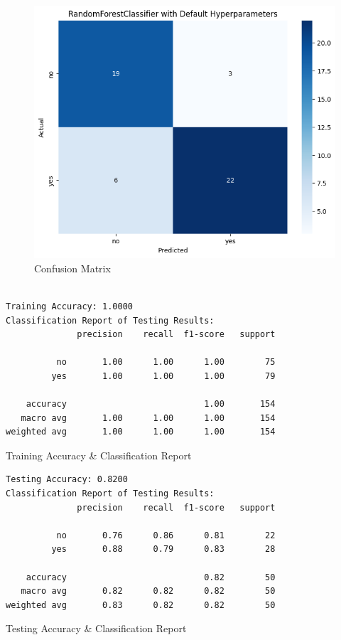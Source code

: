 \documentclass[a4paper, 10pt]{article}
\newenvironment{code}{\captionsetup{type=listing}}{}
\begin{document}
\begin{minipage}{0.45\textwidth} 
\begin{figure}[H]
    \centering
    \includegraphics[width=\textwidth]{./images/randomforestclassifier_defaulthyperparameters_confusionmatrix.png}
    \caption{Confusion Matrix}
\end{figure}
\end{minipage}\hspace{0.05\textwidth}
\begin{minipage}{0.45\textwidth} 
\begin{code}
\begin{verbatim}

Training Accuracy: 1.0000
Classification Report of Testing Results:
              precision    recall  f1-score   support

          no       1.00      1.00      1.00        75
         yes       1.00      1.00      1.00        79

    accuracy                           1.00       154
   macro avg       1.00      1.00      1.00       154
weighted avg       1.00      1.00      1.00       154
\end{verbatim}
\caption{Training Accuracy \& Classification Report}
\end{code}
\begin{code}
\begin{verbatim}
Testing Accuracy: 0.8200
Classification Report of Testing Results:
              precision    recall  f1-score   support

          no       0.76      0.86      0.81        22
         yes       0.88      0.79      0.83        28

    accuracy                           0.82        50
   macro avg       0.82      0.82      0.82        50
weighted avg       0.83      0.82      0.82        50
\end{verbatim}
\caption{Testing Accuracy \& Classification Report}
\end{code}
\end{minipage}
\end{document}
